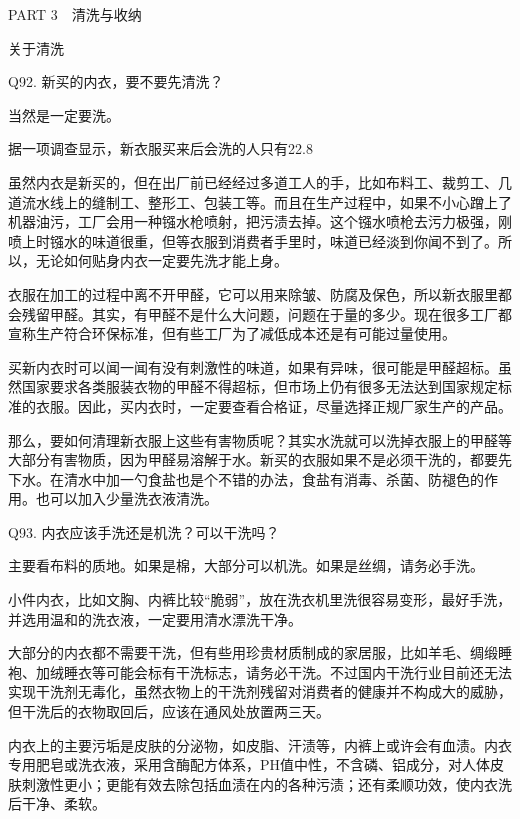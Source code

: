 \documentclass[12pt,UTF8]{ctexbook}
\begin{document}
PART 3　清洗与收纳





关于清洗


Q92. 新买的内衣，要不要先清洗？


当然是一定要洗。

据一项调查显示，新衣服买来后会洗的人只有22.8%


虽然内衣是新买的，但在出厂前已经经过多道工人的手，比如布料工、裁剪工、几道流水线上的缝制工、整形工、包装工等。而且在生产过程中，如果不小心蹭上了机器油污，工厂会用一种镪水枪喷射，把污渍去掉。这个镪水喷枪去污力极强，刚喷上时镪水的味道很重，但等衣服到消费者手里时，味道已经淡到你闻不到了。所以，无论如何贴身内衣一定要先洗才能上身。

衣服在加工的过程中离不开甲醛，它可以用来除皱、防腐及保色，所以新衣服里都会残留甲醛。其实，有甲醛不是什么大问题，问题在于量的多少。现在很多工厂都宣称生产符合环保标准，但有些工厂为了减低成本还是有可能过量使用。

买新内衣时可以闻一闻有没有刺激性的味道，如果有异味，很可能是甲醛超标。虽然国家要求各类服装衣物的甲醛不得超标，但市场上仍有很多无法达到国家规定标准的衣服。因此，买内衣时，一定要查看合格证，尽量选择正规厂家生产的产品。


那么，要如何清理新衣服上这些有害物质呢？其实水洗就可以洗掉衣服上的甲醛等大部分有害物质，因为甲醛易溶解于水。新买的衣服如果不是必须干洗的，都要先下水。在清水中加一勺食盐也是个不错的办法，食盐有消毒、杀菌、防褪色的作用。也可以加入少量洗衣液清洗。





Q93. 内衣应该手洗还是机洗？可以干洗吗？


主要看布料的质地。如果是棉，大部分可以机洗。如果是丝绸，请务必手洗。

小件内衣，比如文胸、内裤比较“脆弱”，放在洗衣机里洗很容易变形，最好手洗，并选用温和的洗衣液，一定要用清水漂洗干净。

大部分的内衣都不需要干洗，但有些用珍贵材质制成的家居服，比如羊毛、绸缎睡袍、加绒睡衣等可能会标有干洗标志，请务必干洗。不过国内干洗行业目前还无法实现干洗剂无毒化，虽然衣物上的干洗剂残留对消费者的健康并不构成大的威胁，但干洗后的衣物取回后，应该在通风处放置两三天。


内衣上的主要污垢是皮肤的分泌物，如皮脂、汗渍等，内裤上或许会有血渍。内衣专用肥皂或洗衣液，采用含酶配方体系，PH值中性，不含磷、铝成分，对人体皮肤刺激性更小；更能有效去除包括血渍在内的各种污渍；还有柔顺功效，使内衣洗后干净、柔软。
\end{document}
